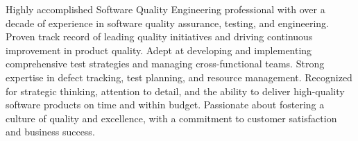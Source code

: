 

\begin{cvparagraph}

Highly accomplished Software Quality Engineering professional with over a decade of experience in software quality assurance, testing, and engineering. Proven track record of leading quality initiatives and driving continuous improvement in product quality. Adept at developing and implementing comprehensive test strategies and managing cross-functional teams. Strong expertise in defect tracking, test planning, and resource management. Recognized for strategic thinking, attention to detail, and the ability to deliver high-quality software products on time and within budget. Passionate about fostering a culture of quality and excellence, with a commitment to customer satisfaction and business success.
\end{cvparagraph}
